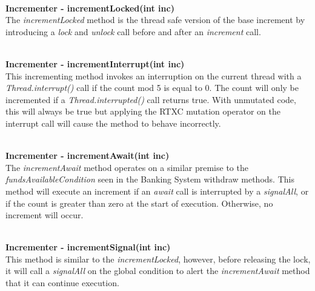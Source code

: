 \documentclass[a4paper,12pt]{article}
\begin{document}
\textbf{\\Incrementer - incrementLocked(int inc)}
\\The \textit{incrementLocked} method is the thread safe version of the base increment by introducing a \textit{lock} and \textit{unlock} call before and after an \textit{increment} call.  

\textbf{\\Incrementer - incrementInterrupt(int inc)}
\\This incrementing method invokes an interruption on the current thread with a \textit{Thread.interrupt()} call if the count mod 5 is equal to 0. The count will only be incremented if a \textit{Thread.interrupted()} call returns true. With unmutated code, this will always be true but applying the RTXC mutation operator on the interrupt call will cause the method to behave incorrectly.    

\textbf{\\Incrementer - incrementAwait(int inc)}
\\The \textit{incrementAwait} method operates on a similar premise to the \textit{fundsAvailableCondition} seen in the Banking System withdraw methods. This method will execute an increment if an \textit{await} call is interrupted by a \textit{signalAll}, or if the count is greater than zero at the start of execution. Otherwise, no increment will occur.

\textbf{\\Incrementer - incrementSignal(int inc)}
\\ This method is similar to the \textit{incrementLocked}, however, before releasing the lock, it will call a \textit{signalAll} on the global condition to alert the \textit{incrementAwait} method that it can continue execution. 
\end{document}
